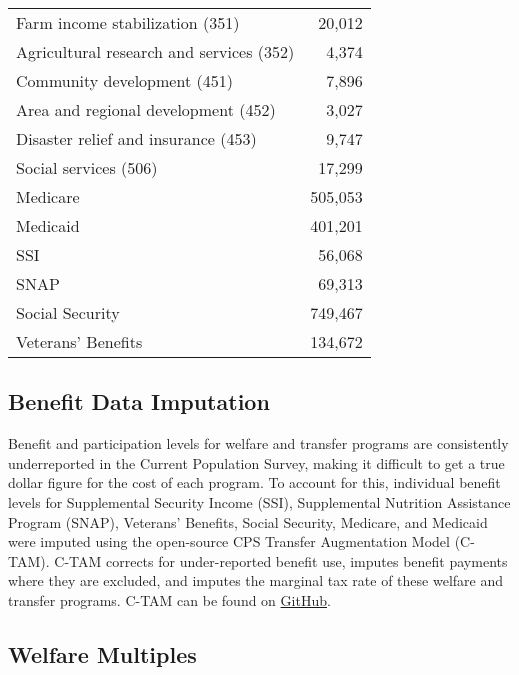 \documentclass{article}
\begin{document}
\begin{table}[H]
\begin{center}
\begin{adjustbox}{max width=\textwidth}
\begin{tabular}{lr}
Farm income stabilization (351) & 20,012 \\
Agricultural research and services (352) & 4,374 \\
Community development (451) & 7,896 \\
Area and regional development (452) & 3,027 \\
Disaster relief and insurance (453) & 9,747 \\
Social services (506) & 17,299 \\
Medicare & 505,053 \\
Medicaid & 401,201 \\
SSI & 56,068 \\
SNAP & 69,313 \\
Social Security & 749,467 \\
Veterans' Benefits & 134,672 \\
\bottomrule
\end{tabular}
\end{adjustbox}
\end{center}
\end{table}
\doublespacing 

\subsection{Benefit Data Imputation}
Benefit and participation levels for welfare and transfer programs are consistently underreported in the Current Population Survey, making it difficult to get a true dollar figure for the cost of each program. To account for this, individual benefit levels for Supplemental Security Income (SSI), Supplemental Nutrition Assistance Program (SNAP), Veterans’ Benefits, Social Security, Medicare, and Medicaid were imputed using the open-source CPS Transfer Augmentation Model (C-TAM). C-TAM corrects for under-reported benefit use, imputes benefit payments where they are excluded, and imputes the marginal tax rate of these welfare and transfer programs. C-TAM can be found on \href{http://www.github.com/open-source-economics/benefits}{GitHub}.


\subsection{Welfare Multiples}
\end{document}
